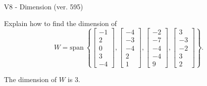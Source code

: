 \begin{exercise}
  \begin{exerciseTitle}V8 - Dimension (ver. 595)\end{exerciseTitle}
  \begin{exerciseStatement}
    Explain how to find the dimension of 
\[W=\mathrm{span}\ \left\{\left[\begin{array}{r}
-1 \\
2 \\
0 \\
3 \\
-4
\end{array}\right] , \left[\begin{array}{r}
-4 \\
-3 \\
-4 \\
2 \\
1
\end{array}\right] , \left[\begin{array}{r}
-2 \\
-7 \\
-4 \\
-4 \\
9
\end{array}\right] , \left[\begin{array}{r}
3 \\
-3 \\
-2 \\
3 \\
2
\end{array}\right]\right\}.\]



  \end{exerciseStatement}
  \begin{exerciseAnswer}
   The dimension of \(W\) is  \(3\).
  


  \end{exerciseAnswer}
\end{exercise}